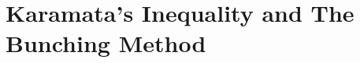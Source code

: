 \documentclass[inequalities.tex]{subfile}
\begin{document}
	\section{Karamata's Inequality and The Bunching Method}\label{sec:bunching}
\end{document}
